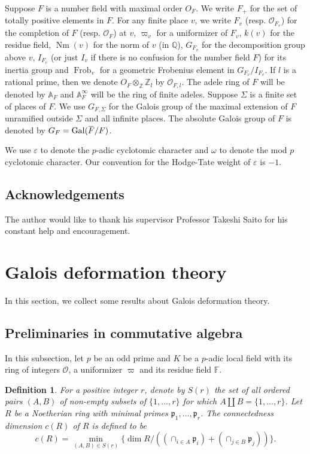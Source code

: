 \documentclass[a4paper, 12pt]{amsart}
\newtheorem{defn}[thm]{Definition} \theoremstyle{remark}
\DeclareMathOperator{\Gal}{Gal}
\DeclareMathOperator{\Frob}{Frob}
\newcommand{\Z}{\mathbb{Z}}
\newcommand{\Q}{\mathbb{Q}}
\newcommand{\A}{\mathbb{A}}
\newcommand{\cO}{\mathcal{O}}
\newcommand{\overbar}[1]{\mkern 1.5mu\overline{\mkern-1.5mu#1\mkern-1.5mu}\mkern 1.5mu}
\begin{document}
	Suppose $F$ is a number field with maximal order $O_F$. We write $F_+$ for the set of totally positive elements in $F$. For any finite place $v$, we write $F_v$ (resp. $\cO_{F_v}$) for the completion of $F$ (resp. $\cO_F$) at $v$, $\varpi_v$ for a uniformizer of $F_v$, $k(v)$ for the residue field, $\operatorname{Nm}(v)$ for the norm of $v$ (in $\Q$),  $G_{F_v}$ for the decomposition group above $v$, $I_{F_v}$ (or just $I_v$ if there is no confusion for the number field $F$) for its inertia group and $\Frob_v$ for a geometric Frobenius element in $G_{F_v}/I_{F_v}$. If $l$ is a rational prime, then we denote $O_F\otimes_\Z \Z_l$ by $\cO_{F,l}$. The adele ring of $F$ will be denoted by $\A_F$ and $\A_F^\infty$ will be the ring of finite adeles. Suppose $\Sigma$ is a finite set of places of $F$. We use $G_{F, \Sigma}$ for the Galois group of the maximal extension of $F$ unramified outside $\Sigma$ and all infinite places. The absolute Galois group of $F$ is denoted by $G_F=\Gal(\overbar{F}/F)$. 
	
	We use $\varepsilon$ to denote the $p$-adic cyclotomic character and $\omega$ to denote the mod $p$ cyclotomic character. Our convention for the Hodge-Tate weight of $\varepsilon$ is $-1$. 
	
	
	\subsection{Acknowledgements}
	The author would like to thank his supervisor Professor Takeshi Saito for his constant help and encouragement. 
	
	\section{Galois deformation theory}
	
	In this section, we collect some results about Galois deformation theory.
	
	\subsection{Preliminaries in commutative algebra}
	
	In this subsection, let $p$ be an odd prime and $K$ be a $p$-adic local field with its ring of integers $\mathcal{O}$, a uniformizer $\varpi$ and its residue field $\mathbb{F}$.
	
	\begin{defn} \cite[Remark 19.2.5]{localcoh}
		For a positive integer $r$, denote by $S(r)$ the set of all ordered pairs $(A,B)$ of non-empty subsets of $\{1, ..., r\}$ for which $A \amalg B=\{1, ..., r\}$. Let $R$ be a Noetherian ring with minimal primes $\mathfrak{p}_1, ..., \mathfrak{p}_r$. The \textit{connectedness dimension} $c(R)$ of $R$ is defined to be $$
		c(R) = \min_{(A,B) \in S(r)} \{\dim R/((\cap_{i \in A} \mathfrak{p}_i)+(\cap_{j \in B} \mathfrak{p}_j))\}.$$ 
	\end{defn}
	
\end{document}
